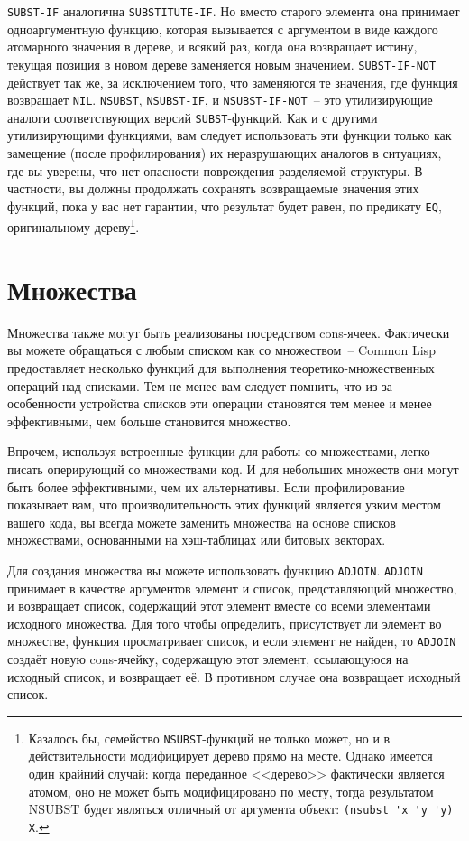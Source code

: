 \lstinline{SUBST-IF} аналогична \lstinline{SUBSTITUTE-IF}. Но вместо старого элемента она принимает
одноаргументную функцию, которая вызывается с аргументом в виде каждого атомарного
значения в дереве, и всякий раз, когда она возвращает истину, текущая позиция в новом
дереве заменяется новым значением. \lstinline{SUBST-IF-NOT} действует так же, за исключением
того, что заменяются те значения, где функция возвращает \lstinline{NIL}. \lstinline{NSUBST},
\lstinline{NSUBST-IF}, и \lstinline{NSUBST-IF-NOT}~-- это утилизирующие аналоги соответствующих
версий \lstinline{SUBST}-функций. Как и с другими утилизирующими функциями, вам следует
использовать эти функции только как замещение (после профилирования) их неразрушающих
аналогов в ситуациях, где вы уверены, что нет опасности повреждения разделяемой
структуры. В частности, вы должны продолжать сохранять возвращаемые значения этих функций,
пока у вас нет гарантии, что результат будет равен, по предикату \lstinline{EQ}, оригинальному
дереву\footnote{Казалось бы, семейство \lstinline{NSUBST}-функций не только может, но и в
  действительности модифицирует дерево прямо на месте. Однако имеется один крайний случай:
  когда переданное <<дерево>> фактически является атомом, оно не может быть модифицировано
  по месту, тогда результатом NSUBST будет являться отличный от аргумента объект:
  \lstinline!(nsubst 'x 'y 'y) X!.}.

\section{Множества}

Множества также могут быть реализованы посредством cons-ячеек. Фактически вы можете
обращаться с любым списком как со множеством~-- Common Lisp предоставляет несколько функций
для выполнения теоретико-множественных операций над списками. Тем не менее вам следует
помнить, что из-за особенности устройства списков эти операции становятся тем менее и
менее эффективными, чем больше становится множество.

Впрочем, используя встроенные функции для работы со множествами, легко писать оперирующий со
множествами код. И для небольших множеств они могут быть более эффективными, чем их
альтернативы. Если профилирование показывает вам, что производительность этих функций
является узким местом вашего кода, вы всегда можете заменить множества на основе списков
множествами, основанными на хэш-таблицах или битовых векторах.

Для создания множества вы можете использовать функцию \lstinline{ADJOIN}. \lstinline{ADJOIN}
принимает в качестве аргументов элемент и список, представляющий множество, и возвращает
список, содержащий этот элемент вместе со всеми элементами исходного множества.  Для того
чтобы определить, присутствует ли элемент во множестве, функция просматривает список, и
если элемент не найден, то \lstinline{ADJOIN} создаёт новую cons-ячейку, содержащую этот
элемент, ссылающуюся на исходный список, и возвращает её. В противном случае она
возвращает исходный список.

